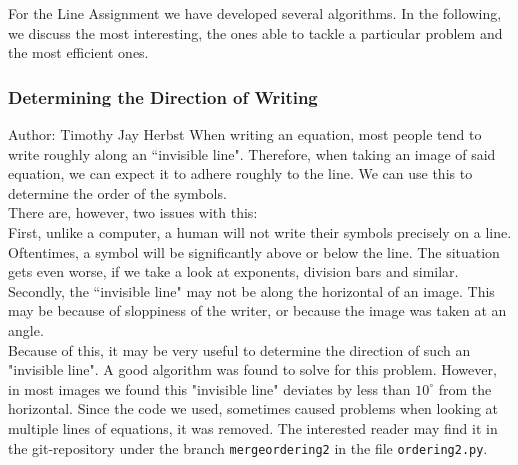 \documentclass[12pt]{article}
\begin{document}
	For the Line Assignment we have developed several algorithms. In the following, we discuss the most interesting, the ones able to tackle a particular problem and the most efficient ones.
	
	\subsubsection{Determining the Direction of Writing}
	\small{Author: Timothy Jay Herbst} \newline \newline
	When writing an equation, most people tend to write roughly along an ``invisible line".
	Therefore, when taking an image of said equation, we can expect it to adhere roughly to the line.
	We can use this to determine the order of the symbols.\\
	There are, however, two issues with this:\\
	First, unlike a computer, a human will not write their symbols precisely on a line.
	Oftentimes, a symbol will be significantly above or below the line.
	The situation gets even worse, if we take a look at exponents, division bars and similar.\\
	Secondly, the ``invisible line" may not be along the horizontal of an image.
	This may be because of sloppiness of the writer, or because the image was taken at an angle.\\
	Because of this, it may be very useful to determine the direction of such an "invisible line".
	A good algorithm was found to solve for this problem.
	However, in most images we found this "invisible line" deviates by less than $10^\circ$ from the horizontal.
	Since the code we used, sometimes caused problems when looking at multiple lines of equations, it was removed.
	The interested reader may find it in the git-repository under the branch \texttt{mergeordering2} in the file \texttt{ordering2.py}.
	
	
	
	
	
\end{document}
